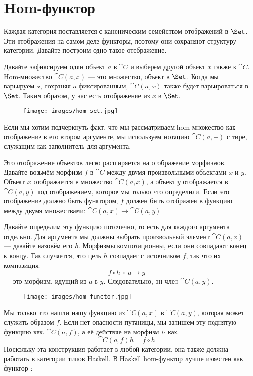 \section{Hom-функтор}

Каждая категория поставляется с каноническим семейством отображений в
$\Set$. Эти отображения на самом деле функторы, поэтому они сохраняют
структуру категории. Давайте построим одно такое отображение.

Давайте зафиксируем один объект $a$ в $\cat{C}$ и выберем другой объект
$x$ также в $\cat{C}$. Hom-множество $\cat{C}(a, x)$ --- это множество,
объект в $\Set$. Когда мы варьируем $x$, сохраняя $a$
фиксированным, $\cat{C}(a, x)$ также будет варьироваться в $\Set$. Таким образом, у нас есть
отображение из $x$ в $\Set$.

\begin{figure}[H]
  \centering
  \texttt{[image: images/hom-set.jpg]}
\end{figure}

\noindent
Если мы хотим подчеркнуть факт, что мы рассматриваем hom-множество как
отображение в его втором аргументе, мы используем нотацию $\cat{C}(a, -)$
с тире, служащим как заполнитель для аргумента.

Это отображение объектов легко расширяется на отображение морфизмов.
Давайте возьмём морфизм $f$ в $\cat{C}$ между двумя произвольными
объектами $x$ и $y$. Объект $x$ отображается в
множество $\cat{C}(a, x)$, а объект $y$ отображается в
$\cat{C}(a, y)$ под отображением, которое мы только что определили. Если это
отображение должно быть функтором, $f$ должен быть отображён в функцию
между двумя множествами: $\cat{C}(a, x) \to \cat{C}(a, y)$

Давайте определим эту функцию поточечно, то есть для каждого аргумента
отдельно. Для аргумента мы должны выбрать произвольный элемент
$\cat{C}(a, x)$ --- давайте назовём его $h$. Морфизмы
композиционны, если они совпадают конец к концу. Так случается, что цель
$h$ совпадает с источником $f$, так что их композиция:
\[f \circ h \Colon a \to y\]
--- это морфизм, идущий из $a$ в $y$. Следовательно, он
член $\cat{C}(a, y)$.

\begin{figure}[H]
  \centering
  \texttt{[image: images/hom-functor.jpg]}
\end{figure}

\noindent
Мы только что нашли нашу функцию из $\cat{C}(a, x)$ в
$\cat{C}(a, y)$, которая может служить образом $f$. Если нет
опасности путаницы, мы запишем эту поднятую функцию как: $\cat{C}(a, f)$,
а её действие на морфизм $h$ как:
\[\cat{C}(a, f) h = f \circ h\]
Поскольку эта конструкция работает в любой категории, она также должна работать в
категории типов Haskell. В Haskell hom-функтор лучше известен
как функтор :

